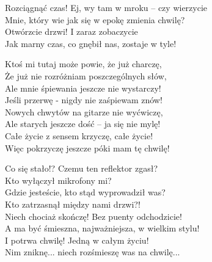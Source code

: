 \begin{text}
    Rozciągnąć czas! Ej, wy tam w mroku – czy wierzycie\\
    Mnie, który wie jak się w epokę zmienia chwilę?\\
    Otwórzcie drzwi! I zaraz zobaczycie\\
    Jak marny czas, co gnębił nas, zostaje w tyle!

    Ktoś mi tutaj może powie, że już charczę,\\
    Że już nie rozróżniam poszczególnych słów,\\
    Ale mnie śpiewania jeszcze nie wystarczy!\\
    Jeśli przerwę - nigdy nie zaśpiewam znów!\\
    Nowych chwytów na gitarze nie wyćwiczę,\\
    Ale starych jeszcze dość – ja się nie mylę!\\
    Całe życie z sensem krzyczę, całe życie!\\
    Więc pokrzyczę jeszcze póki mam tę chwilę!

    Co się stało!? Czemu ten reflektor zgasł?\\
    Kto wyłączył mikrofony mi?\\
    Gdzie jesteście, kto stąd wyprowadził was?\\
    Kto zatrzasnął między nami drzwi?!\\
    Niech chociaż skończę! Bez puenty odchodzicie!\\
    A ma być śmieszna, najważniejsza, w wielkim stylu!\\
    I potrwa chwilę! Jedną w całym życiu!\\
    Nim zniknę... niech rozśmieszę was na chwilę...
\end{text}
